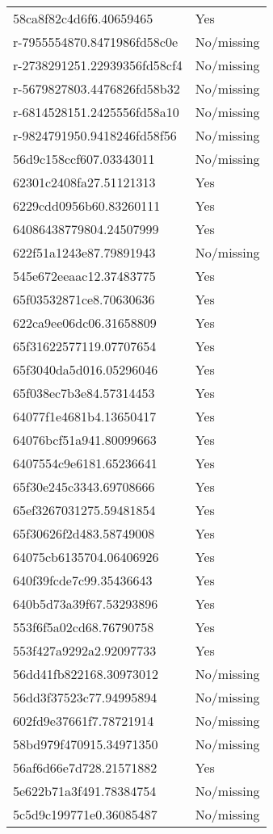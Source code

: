 \begin{tabular}{ll}
58ca8f82c4d6f6.40659465 & Yes \\
r-7955554870.8471986fd58c0e & No/missing \\
r-2738291251.22939356fd58cf4 & No/missing \\
r-5679827803.4476826fd58b32 & No/missing \\
r-6814528151.2425556fd58a10 & No/missing \\
r-9824791950.9418246fd58f56 & No/missing \\
56d9c158ccf607.03343011 & No/missing \\
62301c2408fa27.51121313 & Yes \\
6229cdd0956b60.83260111 & Yes \\
64086438779804.24507999 & Yes \\
622f51a1243e87.79891943 & No/missing \\
545e672eeaac12.37483775 & Yes \\
65f03532871ce8.70630636 & Yes \\
622ca9ee06dc06.31658809 & Yes \\
65f31622577119.07707654 & Yes \\
65f3040da5d016.05296046 & Yes \\
65f038ec7b3e84.57314453 & Yes \\
64077f1e4681b4.13650417 & Yes \\
64076bcf51a941.80099663 & Yes \\
6407554c9e6181.65236641 & Yes \\
65f30e245c3343.69708666 & Yes \\
65ef3267031275.59481854 & Yes \\
65f30626f2d483.58749008 & Yes \\
64075cb6135704.06406926 & Yes \\
640f39fcde7c99.35436643 & Yes \\
640b5d73a39f67.53293896 & Yes \\
553f6f5a02cd68.76790758 & Yes \\
553f427a9292a2.92097733 & Yes \\
56dd41fb822168.30973012 & No/missing \\
56dd3f37523c77.94995894 & No/missing \\
602fd9e37661f7.78721914 & No/missing \\
58bd979f470915.34971350 & No/missing \\
56af6d66e7d728.21571882 & Yes \\
5e622b71a3f491.78384754 & No/missing \\
5c5d9c199771e0.36085487 & No/missing \\

\end{tabular}
